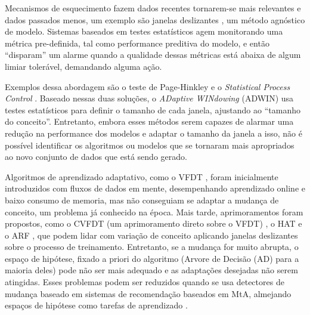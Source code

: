 Mecanismos de esquecimento fazem dados recentes tornarem-se mais relevantes e dados passados menos, um exemplo são janelas deslizantes \cite{gaber2005mining}, um método agnóstico de modelo. 
Sistemas baseados em testes estatísticos agem monitorando uma métrica pre-definida, tal como performance preditiva do modelo, e então ``disparam'' um alarme quando a qualidade dessas métricas está abaixa de algum limiar tolerável, demandando alguma ação.

Exemplos dessa abordagem são o teste de Page-Hinkley e o \textit{Statistical Process Control} \cite{gama2010knowledge}.
Baseado nessas duas soluções, o \textit{ADaptive WINdowing} (ADWIN) \cite{bifet2007learning} usa testes estatísticos para definir o tamanho de cada janela, ajustando ao ``tamanho do conceito''.
Entretanto, embora esses métodos serem capazes de alarmar uma redução na performance dos modelos e adaptar o tamanho da janela a isso, não é possível identificar os algoritmos ou modelos que se tornaram mais apropriados ao novo conjunto de dados que está sendo gerado.

Algoritmos de aprendizado adaptativo, como o VFDT \cite{domingos2000mining},
foram inicialmente introduzidos com fluxos de dados em mente, desempenhando aprendizado online e baixo consumo de memoria, mas não conseguiam se adaptar a mudança de conceito, um problema já conhecido na época.
Mais tarde, aprimoramentos foram propostos, como o CVFDT (um aprimoramento direto sobre o VFDT) \cite{hulten2001mining}, o HAT \cite{bifet2009adaptive} e o ARF \cite{gomes2017adaptive}, que podem lidar com variação de conceito aplicando janelas deslizantes sobre o processo de treinamento.
Entretanto, se a mudança for muito abrupta, o espaço de hipótese, fixado a priori do algoritmo (Arvore de Decisão (AD) para a maioria deles) pode não ser mais adequado e as adaptações desejadas não serem atingidas.
Esses problemas podem ser reduzidos quando se usa detectores de mudança baseado em sistemas de recomendação baseados em MtA, almejando espaços de hipótese como tarefas de aprendizado \cite{rossi2014metastream}.


